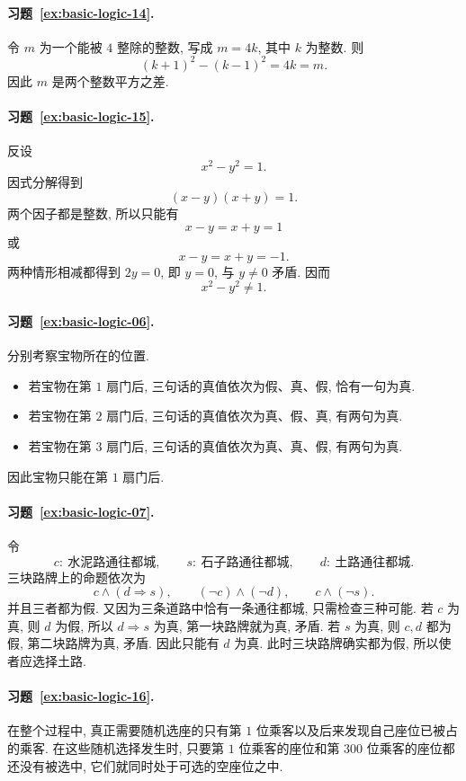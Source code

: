 \documentclass[usesamecnt, thmcnt=section, lang=cn, newtx, 10pt, scheme=chinese]{elegantbook}
\begin{document}
\paragraph*{习题~\ref{ex:basic-logic-14}.}
令 $m$ 为一个能被 $4$ 整除的整数, 写成 $m=4k$, 其中 $k$ 为整数. 则
\[
 (k+1)^2-(k-1)^2
 =4k
 =m.
\]
因此 $m$ 是两个整数平方之差.

\paragraph*{习题~\ref{ex:basic-logic-15}.}
反设
\[
 x^2-y^2=1.
\]
因式分解得到
\[
 (x-y)(x+y)=1.
\]
两个因子都是整数, 所以只能有
\[
 x-y=x+y=1
\]
或
\[
 x-y=x+y=-1.
\]
两种情形相减都得到 $2y=0$, 即 $y=0$, 与 $y\neq0$ 矛盾. 因而
\[
 x^2-y^2\neq1.
\]

\paragraph*{习题~\ref{ex:basic-logic-06}.}
分别考察宝物所在的位置.
\begin{itemize}
  \item 若宝物在第 $1$ 扇门后, 三句话的真值依次为假、真、假, 恰有一句为真.
  \item 若宝物在第 $2$ 扇门后, 三句话的真值依次为真、假、真, 有两句为真.
  \item 若宝物在第 $3$ 扇门后, 三句话的真值依次为真、真、假, 有两句为真.
\end{itemize}
因此宝物只能在第 $1$ 扇门后.

\paragraph*{习题~\ref{ex:basic-logic-07}.}
令
\[
 c:\ \text{水泥路通往都城},\qquad
 s:\ \text{石子路通往都城},\qquad
 d:\ \text{土路通往都城}.
\]
三块路牌上的命题依次为
\[
 c\wedge(d\Rightarrow s),\qquad
 (\neg c)\wedge(\neg d),\qquad
 c\wedge(\neg s).
\]
并且三者都为假. 又因为三条道路中恰有一条通往都城, 只需检查三种可能.
若 $c$ 为真, 则 $d$ 为假, 所以 $d\Rightarrow s$ 为真, 第一块路牌就为真, 矛盾.
若 $s$ 为真, 则 $c,d$ 都为假, 第二块路牌为真, 矛盾.
因此只能有 $d$ 为真. 此时三块路牌确实都为假, 所以使者应选择土路.

\paragraph*{习题~\ref{ex:basic-logic-16}.}
在整个过程中, 真正需要随机选座的只有第 $1$ 位乘客以及后来发现自己座位已被占的乘客. 在这些随机选择发生时, 只要第 $1$ 位乘客的座位和第 $300$ 位乘客的座位都还没有被选中, 它们就同时处于可选的空座位之中.
\end{document}
